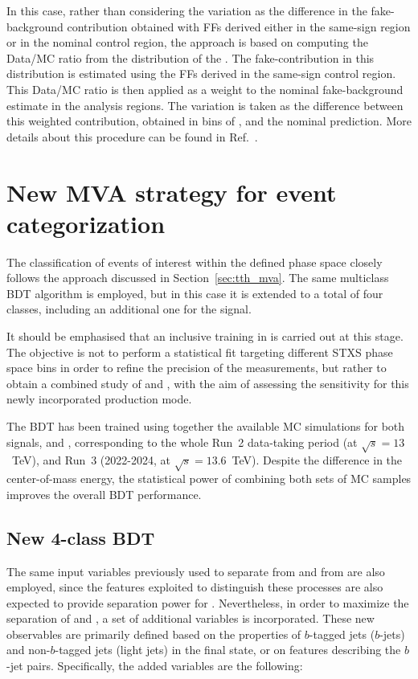 In this case, rather than considering the variation as the difference in the fake-\tauhad background contribution obtained with FFs derived either in the same-sign region or in the nominal control region, the approach is based on computing the Data/MC ratio from the distribution of the \mmc. The fake-\tauhad contribution in this distribution is estimated using the FFs derived in the \tauhadhad same-sign control region. This Data/MC ratio is then applied as a weight to the nominal fake-\tauhad background estimate in the analysis regions. The variation is taken as the difference between this weighted contribution, obtained in bins of \mmc, and the nominal prediction. More details about this procedure can be found in Ref.~\cite{serhat_tesis}.

  


\FloatBarrier
\section{New MVA strategy for event categorization}

The classification of events of interest within the defined phase space closely follows the approach discussed in Section~\ref{sec:tth_mva}. The same multiclass BDT algorithm is employed, but in this case it is extended to a total of four classes, including an additional one for the \thtt signal.

It should be emphasised that an inclusive training in \pth is carried out at this stage. The objective is not to perform a statistical fit targeting different STXS phase space bins in order to refine the precision of the measurements, but rather to obtain a combined study of \ttH and \thqb, with the aim of assessing the sensitivity for this newly incorporated production mode.

The BDT has been trained using together the available MC simulations for both signals, \ztautau and \ttbar, corresponding to the whole Run~2 data-taking period (at $\sqrt{s}=13$~TeV), and Run~3 (2022-2024, at $\sqrt{s} = 13.6$~TeV).
Despite the difference in the center-of-mass energy, the statistical power of combining both sets of MC samples improves the overall BDT performance.

\subsection{New 4-class BDT}
The same input variables previously used to separate \ttH from \ztautau and from \ttbar are also employed, since the features exploited to distinguish these processes are also expected to provide separation power for \thqb.
Nevertheless, in order to maximize the separation of \ttHtt and \thtt, a set of additional variables is incorporated. These new observables are primarily defined based on the properties of $b$-tagged jets ($b$-jets) and non-$b$-tagged jets (light jets) in the final state, or on features describing the $b$-jet pairs. Specifically, the added variables are the following:

